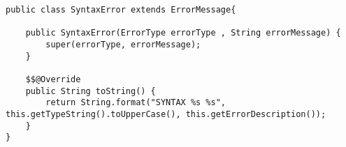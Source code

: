 \begin{lstlisting}[caption={The syntaxError class}, label={eh05}]
public class SyntaxError extends ErrorMessage{

    public SyntaxError(ErrorType errorType , String errorMessage) {
        super(errorType, errorMessage);
    }

    $$@Override
    public String toString() {
        return String.format("SYNTAX %s %s", this.getTypeString().toUpperCase(), this.getErrorDescription());
    }
}
\end{lstlisting}
